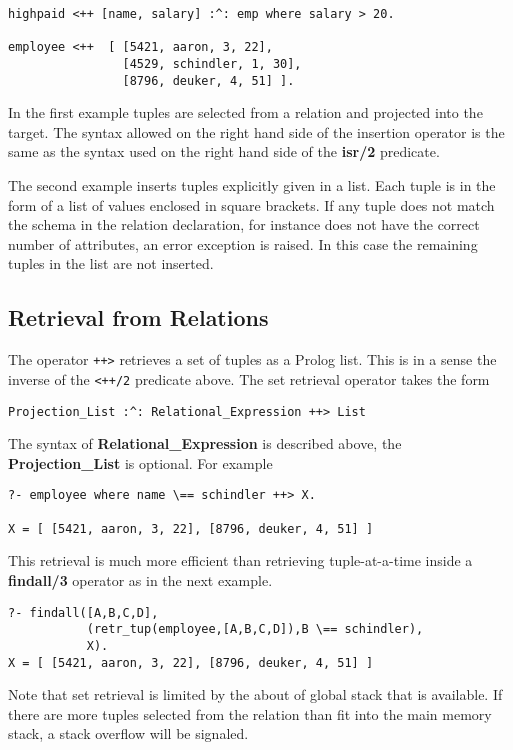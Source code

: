 \begin{verbatim}
highpaid <++ [name, salary] :^: emp where salary > 20.

employee <++  [ [5421, aaron, 3, 22],
                [4529, schindler, 1, 30],
                [8796, deuker, 4, 51] ].
\end{verbatim}
In the first example tuples are selected from a relation and projected
into the target. The syntax allowed on the right hand side of the insertion
operator is the same as the syntax used on the right hand side of the
{\bf isr/2} predicate.

The second example inserts tuples explicitly given in a list.
Each tuple is in the form of a list of values enclosed 
in square brackets. If any tuple does not match the schema in the 
relation declaration, for instance does not have the correct
number of attributes, an error exception is raised. In this case the remaining
tuples in the list are not inserted.

\subsection{Retrieval from Relations}
The operator \verb-++>-  retrieves a set of tuples
as a Prolog list. 
This is in a sense the inverse of the \verb-<++/2- predicate above.
The set retrieval operator takes the form
\begin{verbatim}
Projection_List :^: Relational_Expression ++> List
\end{verbatim}
The syntax of {\bf Relational_Expression} is described above, the
{\bf Projection_List} is optional. For example
\begin{verbatim}
?- employee where name \== schindler ++> X.

X = [ [5421, aaron, 3, 22], [8796, deuker, 4, 51] ]
\end{verbatim}
This retrieval is much more efficient than retrieving tuple-at-a-time
inside a {\bf findall/3} operator as in the next example.

\begin{verbatim}
?- findall([A,B,C,D],
           (retr_tup(employee,[A,B,C,D]),B \== schindler),
           X).
X = [ [5421, aaron, 3, 22], [8796, deuker, 4, 51] ]
\end{verbatim}
Note that set retrieval is limited by the about of global stack
that is available. If there are more tuples selected from
the relation than fit into the main memory stack, a stack overflow
will be signaled.

